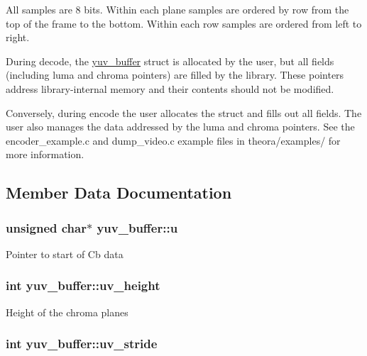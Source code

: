 All samples are 8 bits. Within each plane samples are ordered by row from the top of the frame to the bottom. Within each row samples are ordered from left to right.

During decode, the \hyperlink{structyuv__buffer}{yuv\+\_\+buffer} struct is allocated by the user, but all fields (including luma and chroma pointers) are filled by the library. These pointers address library-\/internal memory and their contents should not be modified.

Conversely, during encode the user allocates the struct and fills out all fields. The user also manages the data addressed by the luma and chroma pointers. See the encoder\+\_\+example.\+c and dump\+\_\+video.\+c example files in theora/examples/ for more information. 

\subsection{Member Data Documentation}
\hypertarget{structyuv__buffer_a8b1857afe3ffac28f259499a57a559e1}{
\subsubsection[{u}]{\setlength{\rightskip}{0pt plus 5cm}unsigned char$\ast$ yuv\+\_\+buffer\+::u}}\label{structyuv__buffer_a8b1857afe3ffac28f259499a57a559e1}
Pointer to start of Cb data \hypertarget{structyuv__buffer_a640f1a0b456d3807f9f0538b22f10097}{
\subsubsection[{uv\+\_\+height}]{\setlength{\rightskip}{0pt plus 5cm}int yuv\+\_\+buffer\+::uv\+\_\+height}}\label{structyuv__buffer_a640f1a0b456d3807f9f0538b22f10097}
Height of the chroma planes \hypertarget{structyuv__buffer_ab265cc24ffb5650bf52daf223b0debb9}{
\subsubsection[{uv\+\_\+stride}]{\setlength{\rightskip}{0pt plus 5cm}int yuv\+\_\+buffer\+::uv\+\_\+stride}}\label{structyuv__buffer_ab265cc24ffb5650bf52daf223b0debb9}
